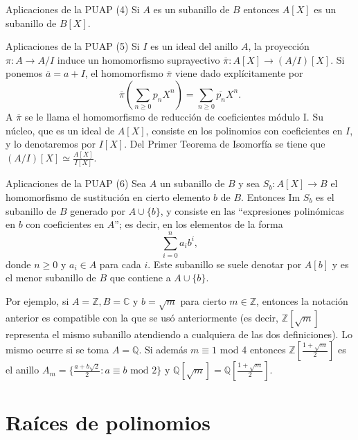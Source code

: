 \begin{example}{Aplicaciones de la PUAP (4)}{}
Si \(A\) es un subanillo de \(B\) entonces \(A[X]\) es un subanillo de \(B[X]\).
\end{example}

\begin{example}{Aplicaciones de la PUAP (5)}{}
Si \(I\) es un ideal del anillo \(A\), la proyección \(\pi : A \to A/I\) induce un homomorfismo suprayectivo \(\overline{\pi} : A[X] \to (A/I)[X]\). Si ponemos \(\overline{a} = a + I\), el homomorfismo \(\overline{\pi}\) viene dado explícitamente por \[\overline{\pi} \left( \sum_{n \geq 0} p_n X^n \right) = \sum_{n \geq 0} \overline{p_n} X^n.\] A \(\overline{\pi}\) se le llama el homomorfismo de reducción de coeficientes módulo I. Su núcleo, que es un ideal de \(A[X]\), consiste en los polinomios con coeficientes en \(I\), y lo denotaremos por \(I[X]\). Del Primer Teorema de Isomorfía se tiene que \((A/I)[X] \simeq \frac{A[X]}{I[X]}.\)
\end{example}

\begin{example}{Aplicaciones de la PUAP (6)}{}
Sea \(A\) un subanillo de \(B\) y sea \(S_b : A[X] \to B\) el homomorfismo de sustitución en cierto elemento \(b\) de \(B\). Entonces Im \(S_b\) es el subanillo de \(B\) generado por \(A \cup \{b\}\), y consiste en las ``expresiones polinómicas en \(b\) con coeficientes en \(A\)''; es decir, en los elementos de la forma \[\sum_{i=0}^{n} a_i b^i,\] donde \(n \geq 0\) y \(a_i \in A\) para cada \(i\). Este subanillo se suele denotar por \(A[b]\) y es el menor subanillo de \(B\) que contiene a \(A \cup \{b\}\).
    
Por ejemplo, si \(A = \mathbb{Z}, B = \mathbb{C}\) y \(b = \sqrt{m}\) para cierto \(m \in \mathbb{Z}\), entonces la notación anterior es compatible con la que se usó anteriormente (es decir, \(\mathbb{Z}[\sqrt{m}]\) representa el mismo subanillo atendiendo a cualquiera de las dos definiciones). Lo mismo ocurre si se toma \(A = \mathbb{Q}\). Si además \(m \equiv 1\) mod 4 entonces \(\mathbb{Z} \left[ \frac{1+\sqrt{m}}{2} \right]\) es el anillo \(A_m = \{\frac{a + b \sqrt{2}}{2} : a \equiv b \text{ mod 2}\}\) y \(\mathbb{Q}[\sqrt{m}] = \mathbb{Q} \left[ \frac{1+\sqrt{m}}{2} \right]\).
\end{example}

\clearpage
\section{Raíces de polinomios}

